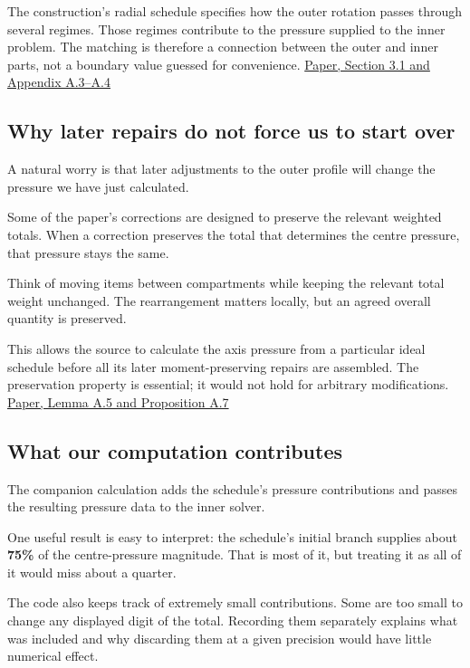 \documentclass[
  english,
  11pt,
]{article}
\begin{document}
The construction's radial schedule specifies how the outer rotation
passes through several regimes. Those regimes contribute to the pressure
supplied to the inner problem. The matching is therefore a connection
between the outer and inner parts, not a boundary value guessed for
convenience.
\href{https://cdn.openai.com/pdf/32d9f210-8b73-45e0-91bc-82a30aef8a9a/navier-stokes.pdf}{Paper,
Section 3.1 and Appendix A.3--A.4}

\subsection{Why later repairs do not force us to start
over}\label{why-later-repairs-do-not-force-us-to-start-over}

A natural worry is that later adjustments to the outer profile will
change the pressure we have just calculated.

Some of the paper's corrections are designed to preserve the relevant
weighted totals. When a correction preserves the total that determines
the centre pressure, that pressure stays the same.

Think of moving items between compartments while keeping the relevant
total weight unchanged. The rearrangement matters locally, but an agreed
overall quantity is preserved.

This allows the source to calculate the axis pressure from a particular
ideal schedule before all its later moment-preserving repairs are
assembled. The preservation property is essential; it would not hold for
arbitrary modifications.
\href{https://cdn.openai.com/pdf/32d9f210-8b73-45e0-91bc-82a30aef8a9a/navier-stokes.pdf}{Paper,
Lemma A.5 and Proposition A.7}

\subsection{What our computation
contributes}\label{what-our-computation-contributes}

The companion calculation adds the schedule's pressure contributions and
passes the resulting pressure data to the inner solver.

One useful result is easy to interpret: the schedule's initial branch
supplies about \textbf{75\%} of the centre-pressure magnitude. That is
most of it, but treating it as all of it would miss about a quarter.

The code also keeps track of extremely small contributions. Some are too
small to change any displayed digit of the total. Recording them
separately explains what was included and why discarding them at a given
precision would have little numerical effect.
\end{document}
